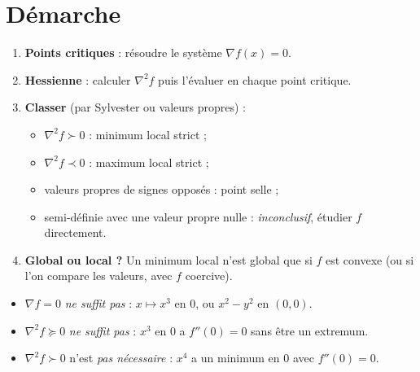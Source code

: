 
\section{Démarche}

\begin{methode}
\begin{enumerate}[label=\textbf{Étape \arabic*.}]
  \item \textbf{Points critiques} : résoudre le système $\nabla f(x)=0$.
  \item \textbf{Hessienne} : calculer $\nabla^2f$ puis l'évaluer en chaque point critique.
  \item \textbf{Classer} (par Sylvester ou valeurs propres) :
    \begin{itemize}
      \item $\nabla^2f\succ0$ : minimum local strict ;
      \item $\nabla^2f\prec0$ : maximum local strict ;
      \item valeurs propres de signes opposés : point selle ;
      \item semi-définie avec une valeur propre nulle : \emph{inconclusif}, étudier $f$ directement.
    \end{itemize}
  \item \textbf{Global ou local ?} Un minimum local n'est global que si $f$ est convexe (ou si l'on compare les valeurs, avec $f$ coercive).
\end{enumerate}
\end{methode}

\begin{attention}
\begin{itemize}
  \item $\nabla f=0$ \emph{ne suffit pas} : $x\mapsto x^3$ en $0$, ou $x^2-y^2$ en $(0,0)$.
  \item $\nabla^2f\succeq0$ \emph{ne suffit pas} : $x^3$ en $0$ a $f''(0)=0$ sans être un extremum.
  \item $\nabla^2f\succ0$ n'est \emph{pas nécessaire} : $x^4$ a un minimum en $0$ avec $f''(0)=0$.
\end{itemize}
\end{attention}

